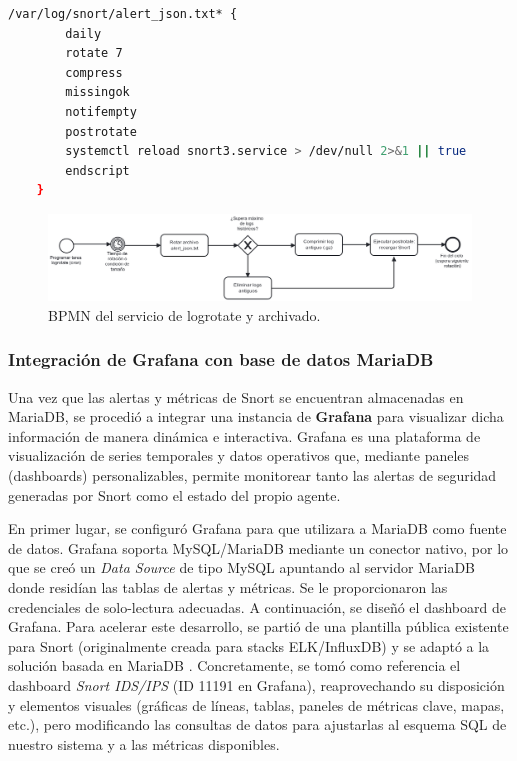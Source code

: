 \documentclass[11pt,a4paper,twoside]{report}
\begin{document}
\begin{lstlisting}[language=bash, caption={Regla de logrotate para los logs de Snort.}, label={lst:logrotate}]
	/var/log/snort/alert_json.txt* {
		daily
		rotate 7
		compress
		missingok
		notifempty
		postrotate
		systemctl reload snort3.service > /dev/null 2>&1 || true
		endscript
	}
\end{lstlisting}

\begin{figure}[H]
	\centering
	\includegraphics[width=1\textwidth]{documento/25.png}
	\caption{BPMN del servicio de logrotate y archivado.}
	\label{fig:bpmn-logrotate}
\end{figure}

\subsubsection{Integración de Grafana con base de datos MariaDB}

Una vez que las alertas y métricas de Snort se encuentran almacenadas en MariaDB, se procedió a integrar una instancia de \textbf{Grafana} para visualizar dicha información de manera dinámica e interactiva. Grafana es una plataforma de visualización de series temporales y datos operativos que, mediante paneles (dashboards) personalizables, permite monitorear tanto las alertas de seguridad generadas por Snort como el estado del propio agente.\newline

En primer lugar, se configuró Grafana para que utilizara a MariaDB como fuente de datos. Grafana soporta MySQL/MariaDB mediante un conector nativo, por lo que se creó un \textit{Data Source} de tipo MySQL apuntando al servidor MariaDB donde residían las tablas de alertas y métricas. Se le proporcionaron las credenciales de solo-lectura adecuadas. A continuación, se diseñó el dashboard de Grafana. Para acelerar este desarrollo, se partió de una plantilla pública existente para Snort (originalmente creada para stacks ELK/InfluxDB) y se adaptó a la solución basada en MariaDB \cite{grafana-dashboard}. Concretamente, se tomó como referencia el dashboard \emph{Snort IDS/IPS} (ID 11191 en Grafana), reaprovechando su disposición y elementos visuales (gráficas de líneas, tablas, paneles de métricas clave, mapas, etc.), pero modificando las consultas de datos para ajustarlas al esquema SQL de nuestro sistema y a las métricas disponibles.\newline
\end{document}
